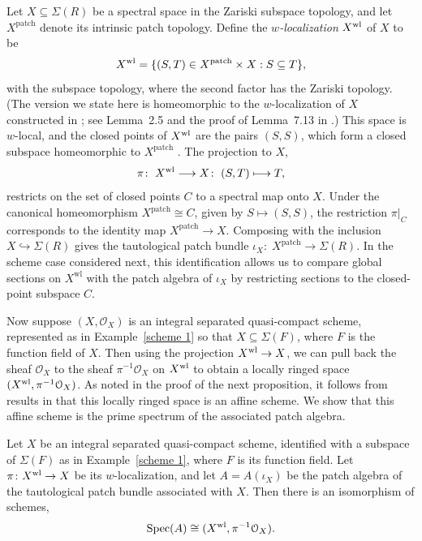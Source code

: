 \documentclass[11pt]{amsart}
\def\O{{\mathcal{O}}}
\begin{document}
Let $X\subseteq\Sigma(R)$ be a spectral space in the Zariski subspace topology, and let $X^{\mathrm{patch}}$ denote its intrinsic patch topology. Define the {\it $w$-localization} $X^{\rm wl}$ of $X$ to be  $$X^{\rm wl}=\{(S,T)\in X^{\mathrm{patch}}\times X:S\subseteq T\},$$ with the subspace topology, where the second factor has the Zariski topology. (The version we state here is homeomorphic to the   $w$-localization of $X$ constructed in \cite[Lemma~2.1.10]{BhattScholze}; see Lemma~2.5 and the proof of Lemma~7.13 in \cite{ScholzeDiamonds}.)  This space is $w$-local, and the  closed points of $X^{\rm wl}$ are the pairs $(S,S)$, which form a closed subspace  homeomorphic to $X^{\mathrm{patch}}$ \cite[Lemma 2.1.10]{BhattScholze}. The projection to $X$, $$ \pi\colon\; X^{\rm wl}\longrightarrow X\colon\; (S,T)\longmapsto T,$$ restricts on the set of closed points $C$  to a spectral map onto $X$. Under the canonical homeomorphism $X^{\mathrm{patch}}\cong C$, given by $S\mapsto(S,S)$, the restriction $\pi|_C$ corresponds to the identity map $X^{\mathrm{patch}}\to X$. Composing with the inclusion
$X\hookrightarrow\Sigma(R)$ gives the tautological patch bundle $\iota_X\colon\; X^{\mathrm{patch}}\to\Sigma(R)$. In the scheme case considered next, this identification allows us to compare global sections on \(X^{\mathrm{wl}}\) with the patch algebra of \(\iota_X\) by restricting sections to the closed-point subspace $C$.

Now suppose $(X,\O_X)$ is an integral separated quasi-compact scheme,  represented as in Example~\ref{scheme 1} so that $X \subseteq \Sigma(F)$, where $F$ is the function field of $X$.   
Then using the projection $X^{\rm wl} \rightarrow X$, we can pull back the 
 sheaf $\O_X$ to the sheaf $\pi^{-1}\O_X$ on $X^{\rm wl}$ to obtain a locally ringed space $(X^{\rm wl},\pi^{-1}\O_X)$.  As noted in the proof of the next proposition, it follows from results in \cite{BhattScholze} that this locally ringed space is an affine scheme. We show that this affine scheme is the prime spectrum of the associated patch algebra. 

\begin{theorem}\label{thm: scheme w-localization}
Let $X$ be an integral separated quasi-compact scheme, identified with a subspace of
$\Sigma(F)$ as in Example~\ref{scheme 1}, where $F$ is its function field.
Let $\pi\colon X^{\rm wl}\to X$ be its $w$-localization, and let $A=A(\iota_X)$ be the patch algebra of the tautological patch bundle associated with $X$.
Then there is an isomorphism of schemes, $$\Spec(A) \cong (X^{\rm wl},\pi^{-1}\O_X).$$  
\end{theorem}
\end{document}
